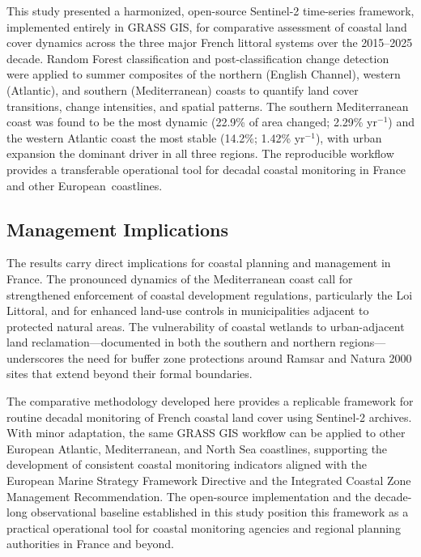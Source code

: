 \documentclass[coasts,article,accept,pdftex,moreauthors]{Definitions/mdpi}
\begin{document}
{This study presented a harmonized, open-source Sentinel-2 time-series framework, implemented entirely in GRASS GIS, for comparative assessment of coastal land cover dynamics across the three major French littoral systems over the 2015--2025 decade. Random Forest classification and post-classification change detection were applied to summer composites of the northern (English Channel), western (Atlantic), and southern (Mediterranean) coasts to quantify land cover transitions, change intensities, and spatial patterns. The southern Mediterranean coast was found to be the most dynamic (22.9\% of area changed; 2.29\% yr$^{-1}$) and the western Atlantic coast the most stable (14.2\%; 1.42\% yr$^{-1}$), with urban expansion the dominant driver in all three regions. The reproducible workflow provides a transferable operational tool for decadal coastal monitoring in France and other European~coastlines.}

\subsection{Management Implications}

The results carry direct implications for coastal planning and management in France. The pronounced dynamics of the Mediterranean coast call for strengthened enforcement of coastal development regulations, particularly the Loi Littoral, and for enhanced land-use controls in municipalities adjacent to protected natural areas. The vulnerability of coastal wetlands to urban-adjacent land reclamation—documented in both the southern and northern regions—underscores the need for buffer zone protections around Ramsar and Natura 2000 sites that extend beyond their formal boundaries.

The comparative methodology developed here provides a replicable framework for routine decadal monitoring of French coastal land cover using Sentinel-2 archives. With minor adaptation, the same GRASS GIS workflow can be applied to other European Atlantic, Mediterranean, and North Sea coastlines, supporting the development of consistent coastal monitoring indicators aligned with the European Marine Strategy Framework Directive and the Integrated Coastal Zone Management Recommendation. The open-source implementation and the decade-long observational baseline established in this study position this framework as a practical operational tool for coastal monitoring agencies and regional planning authorities in France and beyond.

\end{document}
